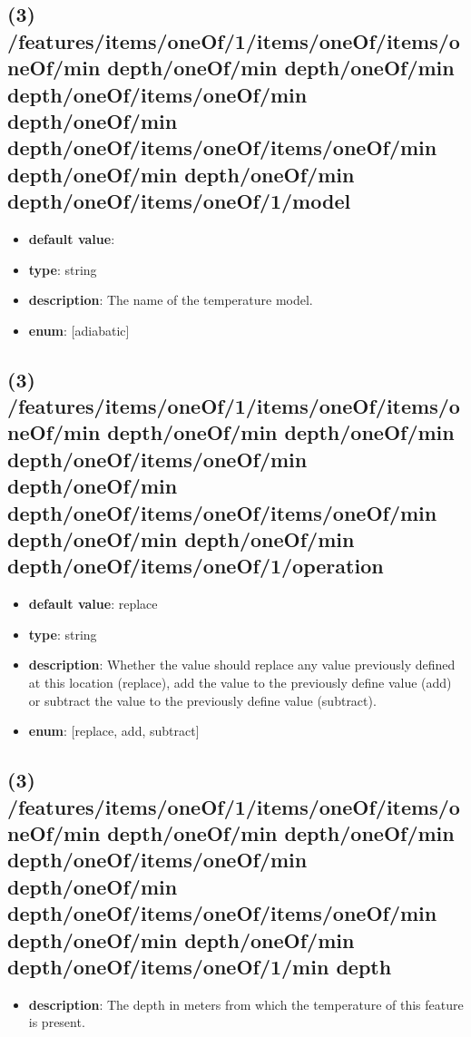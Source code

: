 \subsection{(3) /features/items/oneOf/1/items/oneOf/items/oneOf/min depth/oneOf/min depth/oneOf/min depth/oneOf/items/oneOf/min depth/oneOf/min depth/oneOf/items/oneOf/items/oneOf/min depth/oneOf/min depth/oneOf/min depth/oneOf/items/oneOf/1/model}
\begin{itemize}[leftmargin=3em]\item {\bf default value}: 
\item {\bf type}: string
\item {\bf description}: The name of the temperature model.
\item {\bf enum}: [adiabatic]\end{itemize}\subsection{(3) /features/items/oneOf/1/items/oneOf/items/oneOf/min depth/oneOf/min depth/oneOf/min depth/oneOf/items/oneOf/min depth/oneOf/min depth/oneOf/items/oneOf/items/oneOf/min depth/oneOf/min depth/oneOf/min depth/oneOf/items/oneOf/1/operation}
\begin{itemize}[leftmargin=3em]\item {\bf default value}: replace
\item {\bf type}: string
\item {\bf description}: Whether the value should replace any value previously defined at this location (replace), add the value to the previously define value (add) or subtract the value to the previously define value (subtract).
\item {\bf enum}: [replace, add, subtract]\end{itemize}\subsection{(3) /features/items/oneOf/1/items/oneOf/items/oneOf/min depth/oneOf/min depth/oneOf/min depth/oneOf/items/oneOf/min depth/oneOf/min depth/oneOf/items/oneOf/items/oneOf/min depth/oneOf/min depth/oneOf/min depth/oneOf/items/oneOf/1/min depth}
\begin{itemize}[leftmargin=3em]\item {\bf description}: The depth in meters from which the temperature of this feature is present.
\end{itemize}
